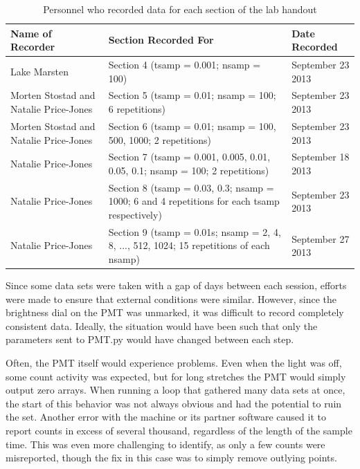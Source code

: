 \documentclass[a4paper,12pt]{article}
\begin{document}
\begin{center}
  \begin{table}[h]
  \centering
  \begin{tabular}{p{1.5in}||p{2.5in}||l}
    Name of Recorder & Section Recorded For & Date Recorded\\
    \hline
    Lake Marsten & Section 4 (tsamp = 0.001; nsamp = 100) & September 23 2013\\
    \hline
    Morten Stostad and Natalie Price-Jones & Section 5 (tsamp = 0.01; nsamp = 100; 6 repetitions) & September 23 2013\\
    \hline
    Morten Stostad and Natalie Price-Jones & Section 6 (tsamp = 0.01; nsamp = 100, 500, 1000; 2 repetitions) & September 23 2013 \\
    \hline
    Natalie Price-Jones & Section 7 (tsamp = 0.001, 0.005, 0.01, 0.05, 0.1; nsamp = 100; 2 repetitions) & September 18 2013\\
    \hline
    Natalie Price-Jones & Section 8 (tsamp = 0.03, 0.3; nsamp = 1000; 6 and 4 repetitions for each tsamp respectively) & September 23 2013\\
    \hline
    Natalie Price-Jones & Section 9 (tsamp = 0.01s; nsamp = 2, 4, 8, ..., 512, 1024; 15 repetitions of each nsamp)& September 27 2013\\
    \end{tabular}
    \caption{Personnel who recorded data for each section of the lab handout}
    \label{tab:datatable}
  \end{table}
\end{center}
Since some data sets were taken with a gap of days between each session, efforts were made to ensure that external conditions were similar. However, since the brightness dial on the PMT was unmarked, it was difficult to record completely consistent data. Ideally, the situation would have been such that only the parameters sent to PMT.py would have changed between each step.

Often, the PMT itself would experience problems. Even when the light was off, some count activity was expected, but for long stretches the PMT would simply output zero arrays. When running a loop that gathered many data sets at once, the start of this behavior was not always obvious and had the potential to ruin the set. Another error with the machine or its partner software caused it to report counts in excess of several thousand, regardless of the length of the sample time. This was even more challenging to identify, as only a few counts were misreported, though the fix in this case was to simply remove outlying points.
\end{document}

